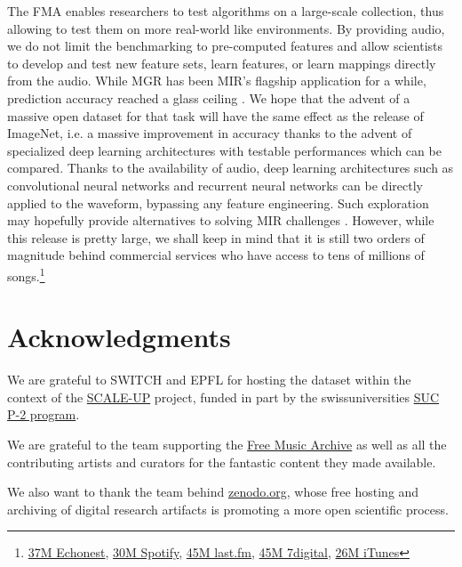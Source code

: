 \documentclass{article}
\begin{document}
The FMA enables researchers to test algorithms on a large-scale collection, thus allowing to test them on more real-world like environments. By providing audio, we do not limit the benchmarking to pre-computed features and allow scientists to develop and test new feature sets, learn features, or learn mappings directly from the audio.
While MGR has been MIR's flagship application for a while, prediction accuracy reached a glass ceiling \cite{mgr_why}. We hope that the advent of a massive open dataset for that task will have the same effect as the release of ImageNet, i.e. a massive improvement in accuracy thanks to the advent of specialized deep learning architectures with testable performances which can be compared.
Thanks to the availability of audio, deep learning architectures such as convolutional neural networks and recurrent neural networks can be directly applied to the waveform, bypassing any feature engineering. Such exploration may hopefully provide alternatives to solving MIR challenges \cite{mir_dl_feature_learning}.
However, while this release is pretty large, we shall keep in mind that it is still two orders of magnitude behind commercial services who have access to tens of millions of songs.\footnote{\href{http://the.echonest.com}{37M Echonest}, \href{https://en.wikipedia.org/wiki/Spotify}{30M Spotify}, \href{http://www.skilledtests.com/wiki/Last.fm_statistics}{45M last.fm}, \href{http://bupz.com/best-websites-to-buy-musics}{45M 7digital}, \href{https://www.apple.com/pr/library/2013/02/06iTunes-Store-Sets-New-Record-with-25-Billion-Songs-Sold.html}{26M iTunes}}



\section{Acknowledgments}


We are grateful to SWITCH and EPFL for hosting the dataset within the context
of the \href{https://projects.switch.ch/scale-up}{SCALE-UP} project, funded in
part by the swissuniversities \href{http://www.swissuniversities.ch/isci}{SUC
P-2 program}.

We are grateful to the team supporting the \href{https://freemusicarchive.org}{Free Music Archive} as well as all the contributing artists and curators for the fantastic content they made available.

We also want to thank the team behind \href{https://zenodo.org}{zenodo.org}, whose free hosting and archiving of digital research artifacts is promoting a more open scientific process.


\end{document}
